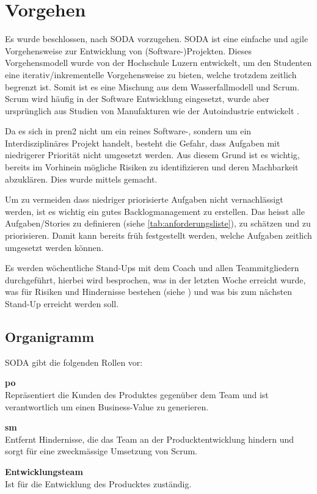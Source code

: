 \newpage

\section{Vorgehen}

Es wurde beschlossen, nach SODA \cite{HSLU-Education-SODA} vorzugehen.
SODA ist eine einfache und agile Vorgehensweise zur Entwicklung von (Software-)Projekten. Dieses Vorgehensmodell wurde von der Hochschule Luzern entwickelt, um den Studenten eine iterativ/inkrementelle Vorgehensweise zu bieten, welche trotzdem zeitlich begrenzt ist. Somit ist es eine Mischung aus dem Wasserfallmodell und Scrum. Scrum wird häufig in der Software Entwicklung eingesetzt, wurde aber ursprünglich aus Studien von Manufakturen wie der Autoindustrie entwickelt \cite{Wikipedia-Scrum-History}.

Da es sich in \acrshort{pren2} nicht um ein reines Software-, sondern um
ein Interdisziplinäres Projekt handelt, besteht die Gefahr, dass Aufgaben
mit niedrigerer Priorität nicht umgesetzt werden. Aus diesem Grund ist es
wichtig, bereits im Vorhinein mögliche Risiken zu identifizieren und deren Machbarkeit
abzuklären. Dies wurde mittels  gemacht.

Um zu vermeiden dass niedriger priorisierte Aufgaben nicht vernachlässigt werden,
ist es wichtig ein gutes Backlogmanagement zu erstellen. Das heisst alle Aufgaben/Stories zu definieren (siehe \ref{tab:anforderungsliste}), zu schätzen und zu priorisieren. Damit kann bereits früh festgestellt werden, welche Aufgaben zeitlich umgesetzt werden können.

Es werden wöchentliche Stand-Ups mit dem Coach und allen Teammitgliedern durchgeführt, hierbei wird besprochen, was in der letzten Woche erreicht wurde, was für Risiken und Hindernisse bestehen (siehe ) und was bis zum nächsten Stand-Up erreicht werden soll.


\newpage

\subsection{Organigramm}
SODA gibt die folgenden Rollen vor:

\begin{items}
  \item {\bf \acrfull{po}} \\
    Repräsentiert die Kunden des Produktes gegenüber dem Team 
    und ist verantwortlich um einen Business-Value zu generieren.
  \item {\bf \acrfull{sm}} \\
    Entfernt Hindernisse, die das Team an der Producktentwicklung hindern und sorgt für eine zweckmässige Umsetzung von Scrum.
  \item {\bf Entwicklungsteam} \\
    Ist für die Entwicklung des Producktes zuständig.
\end{items}

